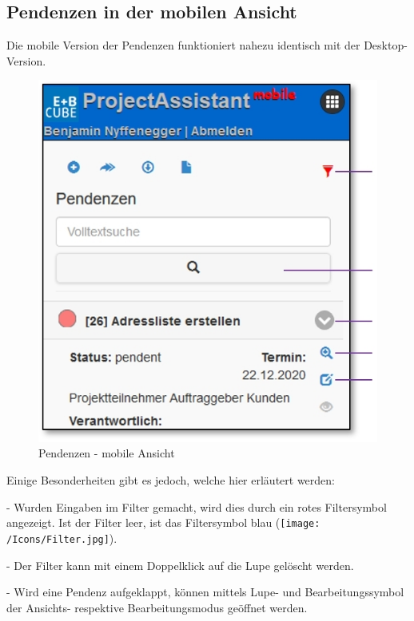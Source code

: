 \subsection{Pendenzen in der mobilen Ansicht}

Die mobile Version der Pendenzen funktioniert nahezu identisch mit der Desktop-Version. 

\vspace{\baselineskip}

\begin{figure}   %
  \vspace{-35pt}      %
  \begin{center}
    \includegraphics[width=1\linewidth]{../chapters/05_Sitzungswesen/pictures/mob_Pendenzen.jpg}
  \end{center}
  \vspace{-20pt}
  \caption{Pendenzen - mobile Ansicht}
  \vspace{-10pt}
\end{figure}

Einige Besonderheiten gibt es jedoch, welche hier erläutert werden:

- Wurden Eingaben im Filter gemacht, wird dies durch ein rotes Filtersymbol angezeigt. Ist der Filter leer, ist das Filtersymbol blau (\texttt{[image: /Icons/Filter.jpg]}).

- Der Filter kann mit einem Doppelklick auf die Lupe gelöscht werden. 

- Wird eine Pendenz aufgeklappt, können mittels Lupe- und Bearbeitungssymbol der Ansichts- respektive Bearbeitungsmodus geöffnet werden.